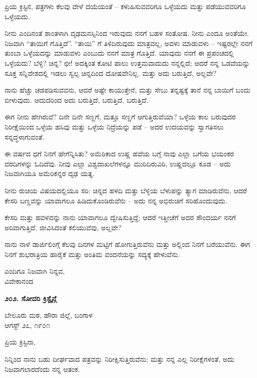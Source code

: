 ಪ್ರಿಯ ಕ್ರಿಸ್ಟಿನ, ಪತ್ರಗಳು ಕೆಲವು ವೇಳೆ ದಯೆಯಂತೆ – ಕಳುಹಿಸುವವರಿಗೂ ಒಳ್ಳೆಯದು ಮತ್ತು ಪಡೆಯುವವರಿಗೂ ಒಳ್ಳೆಯದು.

ನೀನು ಎಂದಿನಂತೆ ಶಾಂತಳಾಗಿ ದೃಢಮನಸ್ಸಿನಿಂದ ಇರುವುದು ನನಗೆ ಬಹಳ ಸಂತೋಷ. ನೀನು ಎಂದೂ ಅಂತೆಯೇ. ನಿಜವಾಗಿ “ತಾಯಿಗೆ ಗೊತ್ತಿದೆ”. “ತಾಯಿ” ಗೆ ತಿಳಿದಿರುವುದು ಮಾತ್ರವಲ್ಲ, ಅವಳು ಮಾಡುವಳು – ಇಷ್ಟರಲ್ಲೇ ನನಗೆ ತುಂಬಾ ಒಳ್ಳೆಯದನ್ನು ಮಾಡುವಳು ಎಂಬುದು ನನಗೆ ಮಾತ್ರ ಗೊತ್ತಿದೆ. ಯಾವುದು ನನಗೆ ಈ ಪ್ರಪಂಚದಲ್ಲಿ ಒಳ್ಳೆಯದು? ಬೆಳ್ಳಿ? ಚಿನ್ನ? ಛೀ! ಅದಕ್ಕಿಂತ ಕೋಟಿ ಪಾಲು ಉತ್ತಮವಾದುದು ನನ್ನಲ್ಲಿದೆ; ಆದರೆ ನನ್ನ ಒಡವೆಯನ್ನು ಸೂಕ್ತ ಸನ್ನಿವೇಶದಲ್ಲಿ ಇಡಲು ಸ್ವಲ್ಪ ಚಿನ್ನದಿಂದ ದೋಷವೇನಿಲ್ಲ. ಮತ್ತು ಅದು ಬರುತ್ತಿದೆ, ಅಲ್ಲವೇ?

ನಾನು ಹೆಚ್ಚು ಚಡಪಡಿಸುವವನು, ಆದರೆ ಅಷ್ಟೇ ಕಾಯುತ್ತೇನೆ; ಮತ್ತು ಸೇಬು ತನ್ನಷ್ಟಕ್ಕೆ ತಾನೆ ನನ್ನ ಬಾಯಿಗೆ ಬಂದು ಬೀಳುವುದು. ಆದುದರಿಂದ ಅದು ಬರುತ್ತಿದೆ, ಬರುತ್ತಿದೆ, ಬರುತ್ತಿದೆ.

ಈಗ ನೀನು ಹೇಗಿರುವೆ? ದಿನೇ ದಿನೇ ಸಣ್ಣಗೆ, ಮತ್ತೂ ಸಣ್ಣಗೆ ಆಗುತ್ತಿರುವೆಯಾ? ಒಳ್ಳೆಯ ಕಾಲ ಬರುವುದರ ನಿರೀಕ್ಷೆಯಿಂದ ಒಳ್ಳೆಯ ಹಸಿವು ಮತ್ತು ಒಳ್ಳೆಯ ನಿದ್ರೆಯನ್ನು ಪಡೆ – ಅದರ ಉದಯವನ್ನು ಸ್ವಾಗತಿಸಲು ಸನ್ನದ್ಧಳಾಗುವಂತೆ.

ಈ ವರ್ಷದ ಧಗೆ ನಿನಗೆ ಹೇಗೆನ್ನಿಸಿತು? ಅಮೆರಿಕಾದ ಉಷ್ಣ ಹವೆಯ ಬಗ್ಗೆ ನಾವು ಎಲ್ಲಾ ಬಗೆಯ ಭಯಂಕರ ವರದಿಗಳನ್ನು ಓದಿದೆವು. ನೀವು ಎಲ್ಲಾ ವಿಶ್ವದಾಖಲೆಗಳನ್ನೂ ಮುರಿದಿರುವಿರಿ, ಉಷ್ಣದಲ್ಲೂ ಕೂಡ – ಅದು ನಿಜವಾಗಿಯೂ ಅಮೆರಿಕನ್ನರ ದೃಢ ಯತ್ನ.

ನೀನು ರುಚಿಯ ವಿಷಯದಲ್ಲಿಯೂ ಸರಿ: ಚಿನ್ನದ ಹಳದಿ ಮತ್ತು ಬೆಳ್ಳಿಯ ಬೆಳುಪನ್ನು ತ್ಯಾಗ ಮಾಡಿರುವೆನು, ಆದರೆ ಕೇಸರಿ ಬಣ್ಣವನ್ನು ಯಾವಾಗಲೂ ಹಿಡಿದುಕೊಂಡಿರುವೆನು – ಅದು ನನ್ನ ಅಭಿರುಚಿಗೆ ಸರಿಹೊಂದುವುದು.

ಕೇಸರಿ ಮತ್ತು ಹವಳವನ್ನು ನಾನು ಯಾವಾಗಲೂ ದ್ವೇಷಿಸುತ್ತಿದ್ದೆ; ಆದರೆ ಇತ್ತೀಚೆಗೆ ಅದರ ಸೌಂದರ್ಯ ನನಗೆ ಅರಿವಾಗುತ್ತಿದೆ. ಜೀವಿಸಿದಂತೆ ಕಲಿಯುವೆವು, ಅಲ್ಲವೇ?

ನಾನು ನಾಳೆ ಡಾರ್ಜಿಲಿಂಗ್ಗೆ ಕೆಲವು ದಿನಗಳ ಮಟ್ಟಿಗೆ ಹೋಗುತ್ತಿರುವೆನು ಮತ್ತು ಅಲ್ಲಿಂದ ನಿನಗೆ ಬರೆಯುವೆನು. ಈಗ ನಿನಗೆ ಶುಭರಾತ್ರಿಯ ಹಾರೈಕೆ ಮತ್ತು ಅಂತಿಮ ವಂದನೆಯನ್ನು ಸದ್ಯಕ್ಕೆ ಹೇಳುವೆನು.

\begin{flushright}
ಎಂದಿಗೂ ನಿಜವಾಗಿ ನಿನ್ನವ,\\ವಿವೇಕಾನಂದ
\end{flushright}

\begin{center}
\textbf{೨೦೨. ಸೋದರಿ ಕ್ರಿಸ್ಟೈನ್ಗೆ}
\end{center}

\begin{flushright}
ಬೇಲೂರು ಮಠ, ಹೌರಾ ಜಿಲ್ಲೆ, ಬಂಗಾಳ\\ಆಗಸ್ಟ್ ೨೭, ೧೯೦೧
\end{flushright}

ಪ್ರಿಯ ಕ್ರಿಸ್ಟಿನಾ,

ನಿನ್ನಿಂದ ನಾನು ಬಹು ದೀರ್ಘವಾದ ಪತ್ರವನ್ನು ನಿರೀಕ್ಷಿಸುತ್ತಿರುವೆನು; ಮತ್ತು ನನ್ನ ಎಲ್ಲ ನಿರೀಕ್ಷೆಗಳಂತೆ, ಅದು ನಿಜವಾಗಲಾರದೆಂದು ನನ್ನ ಆತಂಕ.

